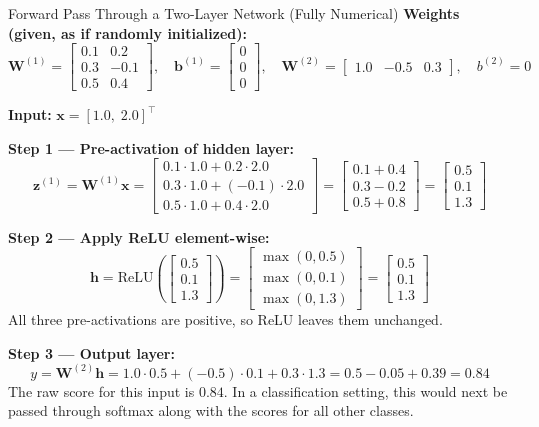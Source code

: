 \begin{examplebox}{Forward Pass Through a Two-Layer Network (Fully Numerical)}
\textbf{Weights (given, as if randomly initialized):}
\[
    \mathbf{W}^{(1)} = \begin{bmatrix} 0.1 & 0.2 \\ 0.3 & -0.1 \\ 0.5 & 0.4 \end{bmatrix}, \quad
    \mathbf{b}^{(1)} = \begin{bmatrix} 0 \\ 0 \\ 0 \end{bmatrix}, \quad
    \mathbf{W}^{(2)} = \begin{bmatrix} 1.0 & -0.5 & 0.3 \end{bmatrix}, \quad
    b^{(2)} = 0
\]

\textbf{Input:} $\mathbf{x} = [1.0,\; 2.0]^\top$

\textbf{Step 1 --- Pre-activation of hidden layer:}
\[
    \mathbf{z}^{(1)} = \mathbf{W}^{(1)}\mathbf{x} =
    \begin{bmatrix} 0.1 \cdot 1.0 + 0.2 \cdot 2.0 \\ 0.3 \cdot 1.0 + (-0.1) \cdot 2.0 \\ 0.5 \cdot 1.0 + 0.4 \cdot 2.0 \end{bmatrix}
    = \begin{bmatrix} 0.1 + 0.4 \\ 0.3 - 0.2 \\ 0.5 + 0.8 \end{bmatrix}
    = \begin{bmatrix} 0.5 \\ 0.1 \\ 1.3 \end{bmatrix}
\]

\textbf{Step 2 --- Apply ReLU element-wise:}
\[
    \mathbf{h} = \text{ReLU}\!\left(\begin{bmatrix}0.5\\0.1\\1.3\end{bmatrix}\right)
    = \begin{bmatrix}\max(0,0.5)\\\max(0,0.1)\\\max(0,1.3)\end{bmatrix}
    = \begin{bmatrix}0.5\\0.1\\1.3\end{bmatrix}
\]
All three pre-activations are positive, so ReLU leaves them unchanged.

\textbf{Step 3 --- Output layer:}
\[
    y = \mathbf{W}^{(2)}\mathbf{h} = 1.0 \cdot 0.5 + (-0.5) \cdot 0.1 + 0.3 \cdot 1.3
      = 0.5 - 0.05 + 0.39 = \mathbf{0.84}
\]
The raw score for this input is $0.84$. In a classification setting, this would next be passed through softmax along with the scores for all other classes.
\end{examplebox}


